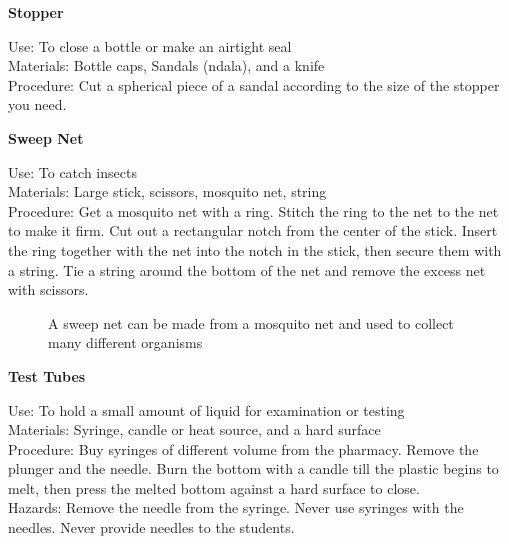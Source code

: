 \begin{flushleft}
\textbf{Stopper}
\end{flushleft}
\vspace{-10pt}
Use: To close a bottle or make an airtight seal\\
Materials: Bottle caps, Sandals (ndala), and a knife\\
Procedure: Cut a spherical piece of a sandal according to the size of the stopper you need.\\

\begin{flushleft}
\textbf{Sweep Net}
\end{flushleft}
\vspace{-10pt}
Use: To catch insects\\
Materials: Large stick, scissors, mosquito net, string\\
Procedure: Get a mosquito net with a ring. Stitch the ring to the net to the net to make it firm. Cut out a rectangular notch from the center of the stick. Insert the ring together with the net into the notch in the stick, then secure them with a string. Tie a string around the bottom of the net and remove the excess net with scissors.\\

\begin{figure}[h]
\begin{center}
\def\svgwidth{9cm}

\caption{A sweep net can be made from a mosquito net and used to collect many different organisms}
\label{fig:butterfly-net}
\end{center}
\end{figure}


\begin{flushleft}
\textbf{Test Tubes}
\end{flushleft}
\vspace{-10pt}
Use: To hold a small amount of liquid for examination or testing\\
Materials: Syringe, candle or heat source, and a hard surface\\
Procedure: Buy syringes of different volume from the pharmacy. Remove the plunger and the needle. Burn the bottom with a candle till the plastic begins to melt, then press the melted bottom against a hard surface to close.\\
Hazards: Remove the needle from the syringe. Never use syringes with the needles. Never provide needles to the students.\\

